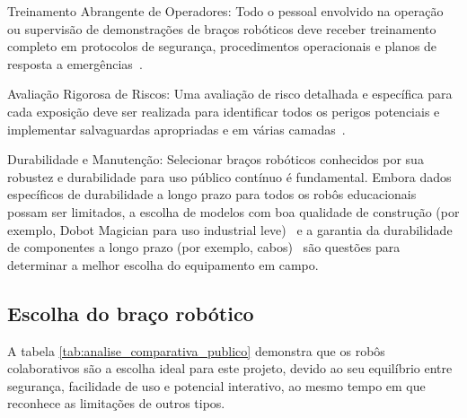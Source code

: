 \documentclass[%
  a4paper,%
  12pt,%
  fleqn,%
  english,%
  brazilian,%
]{article}
\begin{document}
\begin{description}
		\item Treinamento Abrangente de Operadores: Todo o pessoal envolvido na operação ou supervisão de demonstrações de braços robóticos deve receber treinamento completo em protocolos de segurança, procedimentos operacionais e planos de resposta a emergências~\cite{kinovaJacoAssistiveTechnologies2025}.
		\item Avaliação Rigorosa de Riscos: Uma avaliação de risco detalhada e específica para cada exposição deve ser realizada para identificar todos os perigos potenciais e implementar salvaguardas apropriadas e em várias camadas~\cite{top3dshopDobotMagicianReview2023}.
		\item Durabilidade e Manutenção: Selecionar braços robóticos conhecidos por sua robustez e durabilidade para uso público contínuo é fundamental. Embora dados específicos de durabilidade a longo prazo para todos os robôs educacionais possam ser limitados, a escolha de modelos com boa qualidade de construção (por exemplo, Dobot Magician para uso industrial leve)~\cite{robotlabDobotClassroomPack2025} e a garantia da durabilidade de componentes a longo prazo (por exemplo, cabos)~\cite{bostonDynamicsSpot2025} são questões para determinar a melhor escolha do equipamento em campo.
	\end{description}

\subsection{Escolha do braço robótico}
A tabela \ref{tab:analise_comparativa_publico} demonstra que os robôs colaborativos são a escolha ideal para este projeto, devido ao seu equilíbrio entre segurança, facilidade de uso e potencial interativo, ao mesmo tempo em que reconhece as limitações de outros tipos.
\end{document}
